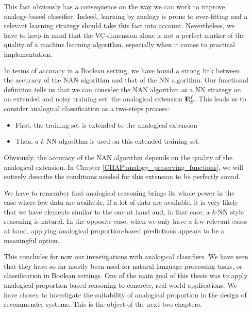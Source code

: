 This fact obviously has a consequence on the way we can
work to improve analogy-based classifier.  Indeed, learning by analogy is prone
to over-fitting and a relevant learning strategy should take this fact into
account.  Nevertheless, we have to keep in mind that the VC-dimension
alone is not a perfect marker of the quality of a machine learning algorithm,
especially when it comes to practical implementation.

In terms of accuracy in a Boolean setting, we have found a strong link between
the accuracy of the NAN algorithm and that of the NN algorithm. Our functional
definition tells us that we can consider the NAN algorithm as a NN strategy on an
extended and noisy training set: the analogical extension $\mathbf{E}_{S}^{f}$. This leads us
to consider analogical classification as a two-steps process:
\begin{itemize}
  \item First, the training set is extended to the analogical extension
  \item Then, a $k$-NN algorithm is used on this extended training set.
\end{itemize}
Obviously, the accuracy of the NAN algorithm depends on the quality of the
analogical extension. In Chapter \ref{CHAP:analogy_preserving_functions}, we
will entirely describe the conditions needed for this extension to be perfectly
sound.

We have to remember that analogical reasoning brings its whole power in the
case where few data are available. If a lot of data are available, it is very
likely that we have elements similar to the one at hand and, in that case, a
$k$-NN style reasoning is natural. In the opposite case, when we only have a
few relevant cases at hand, applying analogical proportion-based predictions
appears to be a meaningful option.

This concludes for now our investigations with analogical classifiers. We have
seen that they have so far mostly been used for natural language processing
tasks, or classification in Boolean settings. One of the main goal of this
thesis was to apply analogical proportion-based reasoning to concrete,
real-world applications. We have chosen to investigate the suitability of
analogical proportion in the design of recommender systems. This is the object
of the next two chapters.
